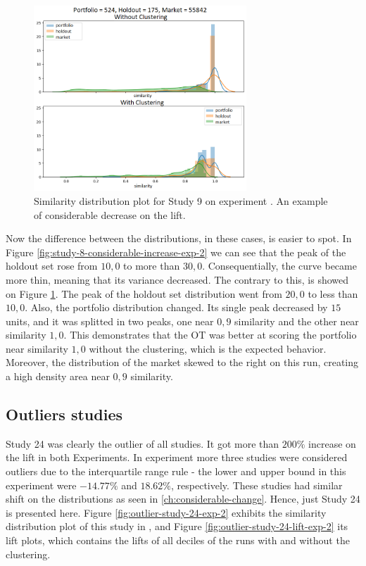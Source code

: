 \begin{figure}[!ht]
   \centering
   \includegraphics[width=8cm]{fig/ch4-study-9-considerable-decrease-exp-1.png}
   \caption{Similarity distribution plot for Study 9 on experiment \nameExperimentI{}. An example of considerable decrease on the lift.}
   \label{fig:study-9-considerable-decrease-exp-1}
\end{figure}

Now the difference between the distributions, in these cases, is easier to spot. In Figure \ref{fig:study-8-considerable-increase-exp-2} we can see that the peak of the holdout set rose from $10,0$ to more than $30,0$. Consequentially, the curve became more thin, meaning that its variance decreased. The contrary to this, is showed on Figure \ref{fig:study-9-considerable-decrease-exp-1}. The peak of the holdout set distribution went from $20,0$ to less than $10,0$. Also, the portfolio distribution changed. Its single peak decreased by $15$ units, and it was splitted in two peaks, one near $0,9$ similarity and the other near similarity $1,0$. This demonstrates that the OT was better at scoring the portfolio near similarity $1,0$ without the clustering, which is the expected behavior. Moreover, the distribution of the market skewed to the right on this run, creating a high density area near $0,9$ similarity. 

\subsection{Outliers studies}
\label{ch:outliers}

Study 24 was clearly the outlier of all studies. It got more than $200\%$ increase on the lift in both Experiments. In experiment \nameExperimentII{} more three studies were considered outliers due to the interquartile range rule - the lower and upper bound in this experiment were $-14.77\%$ and $18.62\%$, respectively. These studies had similar shift on the distributions as seen in \ref{ch:considerable-change}. Hence, just Study 24 is presented here. Figure \ref{fig:outlier-study-24-exp-2} exhibits the similarity distribution plot of this study in \nameExperimentII{}, and Figure \ref{fig:outlier-study-24-lift-exp-2} its lift plots, which contains the lifts of all deciles of the runs with and without the clustering.

